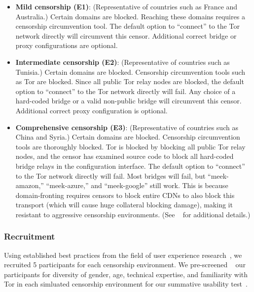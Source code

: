 \documentclass[USenglish,oneside,twocolumn]{article}
\begin{document}
\begin{itemize} \itemsep1pt \parskip0pt 
\item {\bfseries Mild censorship (E1)}: 
(Representative of countries such as France and Australia.)
Certain domains are blocked. Reaching these 
domains requires a censorship circumvention 
tool. The default option to ``connect'' to the Tor network 
directly will circumvent this censor. Additional correct
bridge or proxy configurations are optional. 

\item {\bfseries Intermediate censorship (E2)}: 
(Representative of countries such as Tunisia.)
Certain domains are blocked. Censorship circumvention
tools such as Tor are blocked. Since all public Tor
relay nodes are blocked, the default option to ``connect'' to the Tor network
directly will fail. Any choice of a hard-coded bridge
or a valid non-public bridge will circumvent this censor.  
Additional correct proxy configuration is optional.

\item {\bfseries Comprehensive censorship (E3)}:
(Representative of countries such as China and Syria.)
Certain domains are blocked. Censorship circumvention tools
are thoroughly blocked. Tor is blocked by blocking all public
Tor relay nodes, and the censor has examined source code to block
all hard-coded bridge relays in the configuration interface. The default option
to ``connect'' to the Tor network directly will fail. Most bridges will fail,
but ``meek-amazon,'' ``meek-azure,'' and ``meek-google'' still work.
This is because domain-fronting requires censors to block entire CDNs to also
block this transport (which will cause huge collateral blocking damage), making
it resistant to aggressive censorship environments.
(See ~\cite{fifield2015blocking} for additional details.)\\
\end{itemize}

\subsubsection{Recruitment}
Using established best practices from the field of user experience research~\cite{howmanyusers},
we recruited 5 participants for each censorship environment.
We pre-screened ~\cite{screening} our participants for diversity of gender, age, technical expertise,
and familiarity with Tor in each simluated censorship environment for our summative
usability test~\cite{summative}. 
\end{document}
